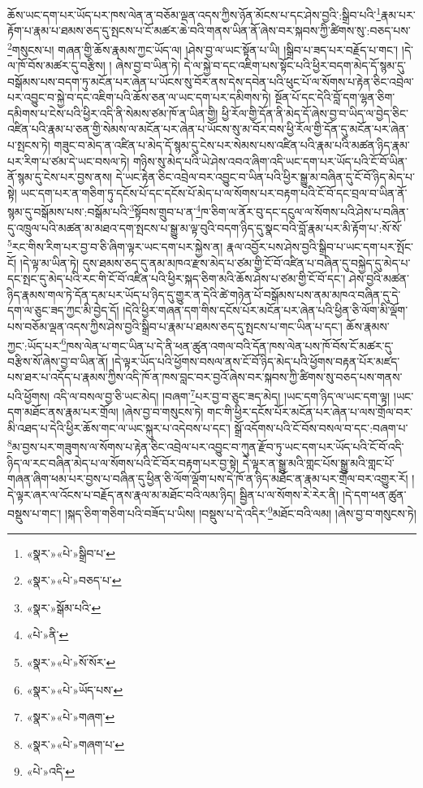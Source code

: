 ཆོས་ཡང་དག་པར་ཡོད་པར་ཁས་ལེན་ན་བཅོམ་ལྡན་འདས་ཀྱིས་ཉོན་མོངས་པ་དང་ཤེས་བྱའི་:སྒྲིབ་པའི་\footnote{«སྣར་»«པེ་»སྒྲིབ་པ་}རྣམ་པར་རྟོག་པ་རྣམ་པ་ཐམས་ཅད་དུ་སྤངས་པ་ངོ་མཚར་ཆེ་བའི་གནས་ཡིན་ནོ་ཞེས་བར་སྐབས་ཀྱི་ཚིགས་སུ་:བཅད་པས་\footnote{«སྣར་»«པེ་»བཅད་པ་}གསུངས་པ། གཞན་གྱི་ཆོས་རྣམས་ཀྱང་ཡོད་ལ། །ཤེས་བྱ་ལ་ཡང་སྟོན་པ་ཡི། །སྒྲིབ་པ་ཟད་པར་བརྗོད་པ་གང་། །དེ་ལ་ཁོ་བོས་མཚར་དུ་བརྩིས། །
ཞེས་བྱ་བ་ཡིན་ཏེ། དེ་ལ་སྐྱེ་བ་དང་འཇིག་པས་སྟོང་པའི་ཕྱིར་བདག་མེད་དོ་སྙམ་དུ་བསྒོམས་པས་བདག་ཏུ་མངོན་པར་ཞེན་པ་ཡོངས་སུ་བོར་ནས་དེས་དབེན་པའི་ཕུང་པོ་ལ་སོགས་པ་རྟེན་ཅིང་འབྲེལ་པར་འབྱུང་བ་སྐྱེ་བ་དང་འཇིག་པའི་ཆོས་ཅན་ལ་ཡང་དག་པར་དམིགས་ཏེ། སྔོན་པོ་དང་དེའི་བློ་དག་ལྷན་ཅིག་དམིགས་པ་ངེས་པའི་ཕྱིར་འདི་ནི་སེམས་ཙམ་ཁོ་ན་ཡིན་གྱི། ཕྱི་རོལ་གྱི་དོན་ནི་མེད་དོ་ཞེས་བྱ་བ་ཡིད་ལ་བྱེད་ཅིང་འཛིན་པའི་རྣམ་པ་ཅན་གྱི་སེམས་ལ་མངོན་པར་ཞེན་པ་ཡོངས་སུ་མ་བོར་བས་ཕྱི་རོལ་གྱི་དོན་དུ་མངོན་པར་ཞེན་པ་སྤངས་ཏེ། གཟུང་བ་མེད་ན་འཛིན་པ་མེད་དོ་སྙམ་དུ་ངེས་པར་སེམས་པས་འཛིན་པའི་རྣམ་པའི་མཚན་ཉིད་རྣམ་པར་རིག་པ་ཙམ་དེ་ཡང་བསལ་ཏེ། གཉིས་སུ་མེད་པའི་ཡེ་ཤེས་འབའ་ཞིག་འདི་ཡང་དག་པར་ཡོད་པའི་ངོ་བོ་ཡིན་ནོ་སྙམ་དུ་ངེས་པར་བྱས་ནས། དེ་ཡང་རྟེན་ཅིང་འབྲེལ་བར་འབྱུང་བ་ཡིན་པའི་ཕྱིར་སྒྱུ་མ་བཞིན་དུ་ངོ་བོ་ཉིད་མེད་པ་སྟེ། ཡང་དག་པར་ན་གཅིག་ཏུ་དངོས་པོ་དང་དངོས་པོ་མེད་པ་ལ་སོགས་པར་བརྟག་པའི་ངོ་བོ་དང་བྲལ་བ་ཡིན་ནོ་སྙམ་དུ་བསྒོམས་པས་:བསྒོམ་པའི་\footnote{«སྣར་»སྒོམ་པའི་}སྟོབས་གྲུབ་པ་ན་\footnote{«པེ་»ནི་}ཁ་ཅིག་ལ་ནོར་བུ་དང་དངུལ་ལ་སོགས་པའི་ཤེས་པ་བཞིན་དུ་འཁྲུལ་པའི་མཚན་མ་མཐའ་དག་སྤངས་པ་སྒྱུ་མ་ལྟ་བུའི་བདག་ཉིད་དུ་སྣང་བའི་བློ་རྣམ་པར་མི་རྟོག་པ་:སོ་སོ་\footnote{«སྣར་»«པེ་»སོ་སོར་}རང་གིས་རིག་པར་བྱ་བ་ཅི་ཞིག་ལྟར་ཡང་དག་པར་སྐྱེས་ན། རྣལ་འབྱོར་པས་ཤེས་བྱའི་སྒྲིབ་པ་ཡང་དག་པར་སྤོང་ངོ། །དེ་ལྟ་མ་ཡིན་ཏེ། དུས་ཐམས་ཅད་དུ་ནམ་མཁའ་རྫས་མེད་པ་ཙམ་གྱི་ངོ་བོ་འཛིན་པ་བཞིན་དུ་བསྐྱེད་དུ་མེད་པ་དང་སྤང་དུ་མེད་པའི་རང་གི་ངོ་བོ་འཛིན་པའི་ཕྱིར་སྐད་ཅིག་མའི་ཆོས་ཤེས་པ་ཙམ་གྱི་ངོ་བོ་དང་། ཤེས་བྱའི་མཚན་ཉིད་རྣམས་གལ་ཏེ་དོན་དམ་པར་ཡོད་པ་ཉིད་དུ་གྱུར་ན་དེའི་ཚེ་གཉེན་པོ་བསྒོམས་པས་ནམ་མཁའ་བཞིན་དུ་དེ་དག་ལ་ཅུང་ཟད་ཀྱང་མི་བྱེད་དོ། །དེའི་ཕྱིར་གཞན་དག་གིས་དངོས་པོར་མངོན་པར་ཞེན་པའི་ཕྱིན་ཅི་ལོག་མི་ལྡོག་པས་བཅོམ་ལྡན་འདས་ཀྱིས་ཤེས་བྱའི་སྒྲིབ་པ་རྣམ་པ་ཐམས་ཅད་དུ་སྤངས་པ་གང་ཡིན་པ་དང་། ཆོས་རྣམས་ཀྱང་:ཡོད་པར་\footnote{«སྣར་»«པེ་»ཡོད་པས་}ཁས་ལེན་པ་གང་ཡིན་པ་དེ་ནི་ཕན་ཚུན་འགལ་བའི་དོན་ཁས་ལེན་པས་ཁོ་བོས་ངོ་མཚར་དུ་བརྩིས་སོ་ཞེས་བྱ་བ་ཡིན་ནོ། །དེ་ལྟར་ཡོད་པའི་ཕྱོགས་བསལ་ནས་ངོ་བོ་ཉིད་མེད་པའི་ཕྱོགས་བརྟན་པོར་མཛད་པས་ཐར་པ་འདོད་པ་རྣམས་ཀྱིས་འདི་ཁོ་ན་ཁས་བླང་བར་བྱའོ་ཞེས་བར་སྐབས་ཀྱི་ཚིགས་སུ་བཅད་པས་གནས་པའི་ཕྱོགས། འདི་ལ་བསལ་བྱ་ཅི་ཡང་མེད། །བཞག་\footnote{«སྣར་»«པེ་»གཞག་}པར་བྱ་བ་ཅུང་ཟད་མེད། །ཡང་དག་ཉིད་ལ་ཡང་དག་ལྟ། །ཡང་དག་མཐོང་ནས་རྣམ་པར་གྲོལ། །ཞེས་བྱ་བ་གསུངས་ཏེ། གང་གི་ཕྱིར་དངོས་པོར་མངོན་པར་ཞེན་པ་ལས་གྲོལ་བར་མི་འཐད་པ་དེའི་ཕྱིར་ཆོས་གང་ལ་ཡང་སྐུར་པ་འདེབས་པ་དང་། སྒྲོ་འདོགས་པའི་ངོ་བོས་བསལ་བ་དང་:བཞག་པ་\footnote{«སྣར་»«པེ་»གཞག་པ་}མ་བྱས་པར་གཟུགས་ལ་སོགས་པ་རྟེན་ཅིང་འབྲེལ་པར་འབྱུང་བ་ཀུན་རྫོབ་ཏུ་ཡང་དག་པར་ཡོད་པའི་ངོ་བོ་འདི་ཉིད་ལ་རང་བཞིན་མེད་པ་ལ་སོགས་པའི་ངོ་བོར་བརྟག་པར་བྱ་སྟེ། དེ་ལྟར་ན་སྒྱུ་མའི་གླང་པོས་སྒྱུ་མའི་གླང་པོ་གཞན་ཞིག་ཕམ་པར་བྱས་པ་བཞིན་དུ་ཕྱིན་ཅི་ལོག་ལྡོག་པས་དེ་ཁོ་ན་ཉིད་མཐོང་ན་རྣམ་པར་གྲོལ་བར་འགྱུར་རོ། །དེ་ལྟར་ཞར་ལ་འོངས་པ་བརྗོད་ནས་རྣལ་མ་མཐོང་བའི་ལམ་ཉིད། སྦྱིན་པ་ལ་སོགས་རེ་རེར་ནི། །དེ་དག་ཕན་ཚུན་བསྡུས་པ་གང་། །སྐད་ཅིག་གཅིག་པའི་བཟོད་པ་ཡིས། །བསྡུས་པ་དེ་འདིར་\footnote{«པེ་»འདི་}མཐོང་བའི་ལམ། །ཞེས་བྱ་བ་གསུངས་ཏེ། 